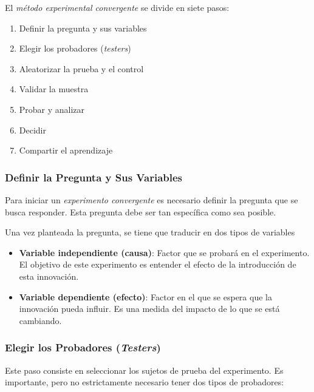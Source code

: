 El \emph{método experimental convergente} se divide en siete pasos:

\begin{enumerate}
	\item Definir la pregunta y sus variables

	\item Elegir los probadores (\emph{testers})

	\item Aleatorizar la prueba y el control

	\item Validar la muestra

	\item Probar y analizar

	\item Decidir

	\item Compartir el aprendizaje
\end{enumerate}

\subsubsection{Definir la Pregunta y Sus Variables}

Para iniciar un \emph{experimento convergente} es necesario definir la pregunta
que se busca responder. Esta pregunta debe ser tan específica como sea posible.

Una vez planteada la pregunta, se tiene que traducir en dos tipos de variables

\begin{itemize}
	\item \textbf{Variable independiente (causa)}: Factor que se probará en el experimento.
	      El objetivo de este experimento es entender el efecto de la introducción de
	      esta innovación.

	\item \textbf{Variable dependiente (efecto)}: Factor en el que se espera que la
	      innovación pueda influir. Es una medida del impacto de lo que se está
	      cambiando.
\end{itemize}

\subsubsection{\texorpdfstring{Elegir los Probadores (\emph{Testers})}{Elegir
		los Probadores (Testers)}}

Este paso consiste en seleccionar los sujetos de prueba del experimento. Es
importante, pero no estrictamente necesario tener dos tipos de probadores:

